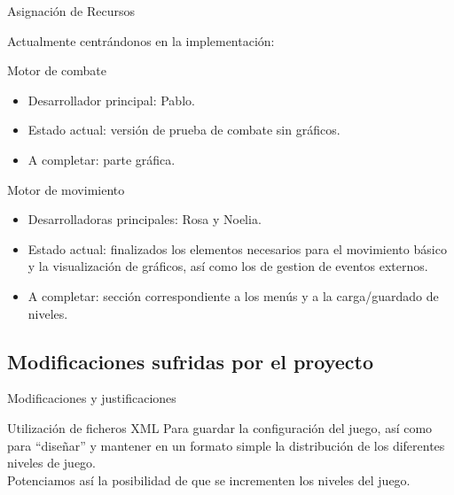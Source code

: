 \documentclass[9pt,xcolor=svgnames]{beamer}
\begin{document}
  
  \begin{frame}{Asignación de Recursos}
   
   Actualmente centrándonos en la implementación:
   
   \begin{block}{Motor de combate}
    \begin{itemize}
     \item Desarrollador principal: Pablo.
     \item Estado actual: versión de prueba de combate sin gráficos.
     \item A completar: parte gráfica.
    \end{itemize}
   \end{block}

   \begin{block}{Motor de movimiento}
    \begin{itemize}
     \item Desarrolladoras principales: Rosa y Noelia.
     \item Estado actual: finalizados los elementos necesarios para el 
	   movimiento básico y la visualización de gráficos, así como los de 
	   gestion de eventos externos. 
     \item A completar: sección correspondiente a los menús y a la
	   carga/guardado de niveles.
    \end{itemize}
   \end{block}
    
  \end{frame}
   
   
   
   \subsection{Modificaciones sufridas por el proyecto}
   
   \begin{frame}{Modificaciones y justificaciones}
    
    \begin{block}{Utilización de ficheros XML}
     Para guardar la configuración del juego, así como para ``diseñar'' y
     mantener en un formato simple la distribución de los diferentes
     niveles de juego.\\
     
     Potenciamos así la posibilidad de que se incrementen los niveles del
     juego.
    \end{block}
    
   \end{frame}
   
\end{document}
